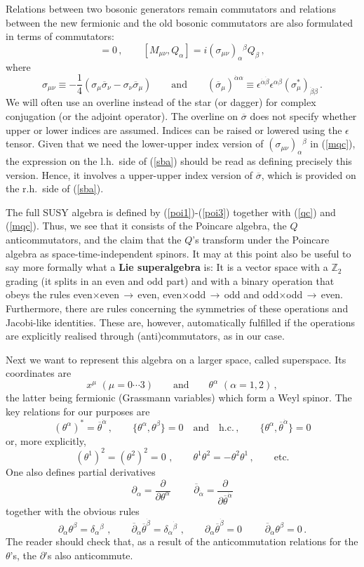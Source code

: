 \documentclass[12pt]{article}
\newcommand{\be}{\begin{equation}}
\newcommand{\ee}{\end{equation}}
\newcommand{\ol}{\overline}
\numberwithin{equation}{section}
\begin{document}
Relations between two bosonic generators remain commutators and relations between the new fermionic and the old bosonic commutators are also formulated in terms of commutators:
\be
[P_\mu,Q_\alpha]=0\,,\qquad [M_{\mu\nu},Q_\alpha]=i(\sigma_{\mu\nu})_\alpha{}^\beta Q_\beta\,,\label{mqc}
\ee
where
\be
\sigma_{\mu\nu}\equiv -\frac{1}{4}(\sigma_\mu\ol{\sigma}_\nu -\sigma_\nu\ol{\sigma}_\mu)\qquad \mbox{and}\qquad (\ol{\sigma}_\mu)^{\dot{\alpha}\alpha} \equiv \epsilon^{\dot{\alpha}\dot{\beta}}\epsilon^{\alpha\beta} (\sigma_\mu^*)_{\dot{\beta}\beta}\,.\label{sba}
\ee
We will often use an overline instead of the star (or dagger) for complex conjugation (or the adjoint operator). The overline on $\ol{\sigma}$ does not specify whether upper or lower indices are assumed. Indices can be raised or lowered using the $\epsilon$ tensor. Given that we need the lower-upper index version of $(\sigma_{\mu\nu})_\alpha{}^\beta$ in (\ref{mqc}), the expression on the l.h.~side of (\ref{sba}) should be read as defining precisely this version. Hence, it involves a upper-upper index version of $\ol{\sigma}$, which is provided on the r.h.~side of (\ref{sba}).

The full SUSY algebra is defined by (\ref{poi1})-(\ref{poi3}) together with (\ref{qc}) and (\ref{mqc}). Thus, we see that it consists of the Poincare algebra, the $Q$ anticommutators, and the claim that the $Q$'s transform under the Poincare algebra as space-time-independent spinors. It may at this point also be useful to say more formally what a {\bf Lie superalgebra} is: It is a vector space with a $\mathbb{Z}_2$ grading (it splits in an even and odd part) and with a binary operation that obeys the rules even$\times$even$\,\to\,$even, even$\times$odd$\,\to\,$odd and odd$\times$odd$\,\to\,$even. Furthermore, there are rules concerning the symmetries of these operations and Jacobi-like identities. These are, however, automatically fulfilled if the operations are explicitly realised through (anti)commutators, as in our case.

Next we want to represent this algebra on a larger space, called superspace. Its coordinates are
\be
x^\mu\,\,(\mu=0\cdots 3)\qquad \mbox{and} \qquad \theta^\alpha\,\,(\alpha=1,2)\,,
\ee
the latter being fermionic (Grassmann variables) which form a Weyl spinor. The key relations for our purposes are
\be
(\theta^\alpha)^*=\ol{\theta}^{\dot{\alpha}}\,,\qquad \{\theta^\alpha,\theta^\beta\}=0\quad\mbox{and}\quad\mbox{h.c.}\,,\qquad 
\{\theta^\alpha,\ol{\theta}^{\dot{\alpha}}\}=0
\ee
or, more explicitly,
\be
(\theta^1)^2=(\theta^2)^2=0\,\,,\qquad \theta^1\theta^2=-\theta^2\theta^1\,, \qquad\mbox{etc.}
\ee
One also defines partial derivatives
\be
\partial_\alpha=\frac{\partial}{\partial\theta^\alpha}\,\,\qquad \ol{\partial}_{\dot{\alpha}}=\frac{\partial}{\partial \ol{\theta}^{\dot{\alpha}}}
\ee
together with the obvious rules
\be
\partial_\alpha\theta^\beta=\delta_\alpha{}^\beta\,\,,\qquad
\ol{\partial}_{\dot{\alpha}}\ol{\theta}^{\dot{\beta}}= \delta_{\dot{\alpha}}{}^{\dot{\beta}}\,\,,\qquad
\partial_\alpha\ol{\theta}^{\dot{\beta}}=0\,\,\qquad
\ol{\partial}_{\dot{\alpha}}\theta^\beta=0\,.
\ee
The reader should check that, as a result of the anticommutation relations for the $\theta$'s, the $\partial$'s also anticommute.
\end{document}
